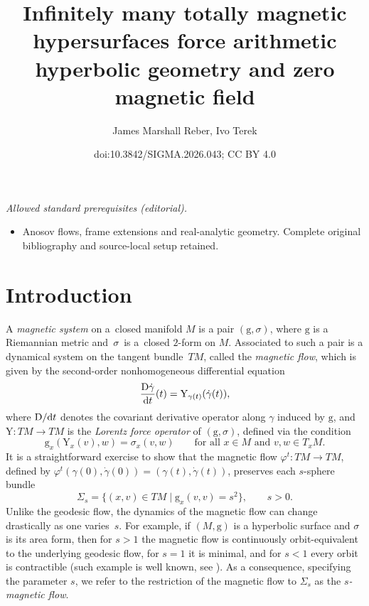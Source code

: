\documentclass[10pt,a4paper]{amsart}
\title{Infinitely many totally magnetic hypersurfaces force arithmetic hyperbolic geometry and zero magnetic field}
\author{James Marshall Reber, Ivo Terek}
\date{doi:10.3842/SIGMA.2026.043; CC BY 4.0}
\newcommand{\g}{\mathrm{g}}
\newcommand{\Y}{\mathrm{Y}}
\numberwithin{equation}{section}
\theoremstyle{definition}
\begin{document}
\maketitle
\noindent\textit{Allowed standard prerequisites (editorial).}\begin{itemize}
\item Anosov flows, frame extensions and real-analytic geometry. Complete original bibliography and source-local setup retained.
\end{itemize}\medskip
\section{Introduction}

A \emph{magnetic system} on a~closed manifold $M$ is a pair $(\g,\sigma)$, where $\g$ is a Riemannian metric and~$\sigma$~is a~closed $2$-form on $M$. Associated to such a pair is a dynamical system on the tangent bundle~$TM$, called the \emph{magnetic flow}, which is given by the second-order nonhomogeneous differential equation
\begin{equation} \label{eqn:magnetic-geodesic} \frac{{\rm D} \dot{\gamma}}{{\rm d}t}(t) = \Y_{\gamma(t)}(\dot{\gamma}(t)),\end{equation}
where ${\rm D}/{\rm d}t$ denotes the covariant derivative operator along $\gamma$ induced by $\g$, and $\Y\colon TM\to TM$ is the \emph{Lorentz force operator} of $(\g,\sigma)$, defined via the condition
\begin{equation}\label{Lorentz-force} \g_x(\Y_x(v), w) = \sigma_x(v,w) \qquad\text{for all } x\in M\mbox{ and } v,w\in T_xM.\end{equation}
It is a straightforward exercise to show that the magnetic flow $\varphi^t\colon TM\to TM$, defined by \mbox{$\varphi^t(\gamma(0), \dot{\gamma}(0)) = (\gamma(t), \dot{\gamma}(t))$}, preserves each $s$-sphere bundle \begin{equation}\label{defn-Sigma_s}
 \Sigma_s = \bigl\{(x,v) \in TM \mid \g_x(v,v) = s^2\bigr\},\qquad s>0.
\end{equation}
Unlike the geodesic flow, the dynamics of the magnetic flow can change drastically as one varies~$s$. For example, if $(M,\g)$ is a hyperbolic surface and $\sigma$ is its area form, then for $s > 1$ the magnetic flow is continuously orbit-equivalent to the underlying geodesic flow, for $s = 1$ it is minimal, and for $s < 1$ every orbit is contractible (such example is well known, see \cite{paternain2006magnetic}). As a consequence, specifying the parameter $s$, we refer to the restriction of the magnetic flow to $\Sigma_s$ as the \emph{$s$-magnetic flow}.
\end{document}
